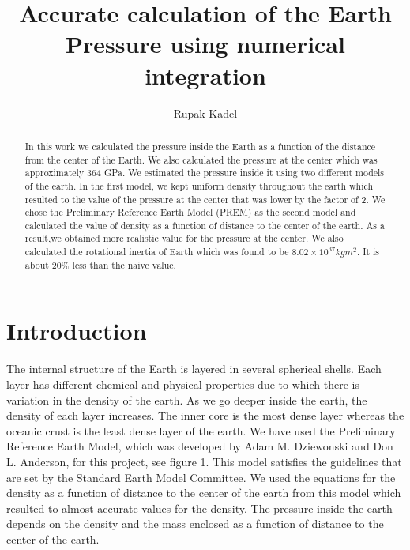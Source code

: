 \documentclass[12pt]{article}
\title{Accurate calculation of the Earth Pressure using numerical integration}
\author{Rupak Kadel}
\begin{document}
\maketitle

\begin{abstract}
In this work we calculated the pressure inside the Earth as a function of the distance from the center of the Earth. We also calculated the pressure at the center which was approximately 364 GPa. We estimated the pressure inside it using two different models of the earth. In the first model, we kept uniform density throughout the earth which resulted to the value of the pressure at the center that was lower by the factor of 2. We chose the Preliminary Reference Earth Model (PREM) as the second model and calculated the value of density as a function of distance to the center of the earth. As a result,we obtained more realistic value for the pressure at the center. We also calculated the rotational inertia of Earth which was found to be $8.02 \times 10^{37} kgm^{2}$. It is about 20\% less than the naive value.
\end{abstract}

\section{Introduction}
The internal structure of the Earth is layered in several spherical shells. Each layer has different chemical and physical properties due to which there is variation in the density of the earth. As we go deeper inside the earth, the density of each layer increases. The inner core is the most dense layer whereas the oceanic crust is the least dense layer of the earth. We have used the Preliminary Reference Earth Model, which was developed by Adam M. Dziewonski and Don L. Anderson, for this project, see figure 1. This model satisfies the guidelines that are set by the Standard Earth Model Committee. We used the equations for the density as a function of distance to the center of the earth from this model which resulted to almost accurate values for the density. The pressure inside the earth depends on the density and the mass enclosed as a function of distance to the center of the earth.
\end{document}

